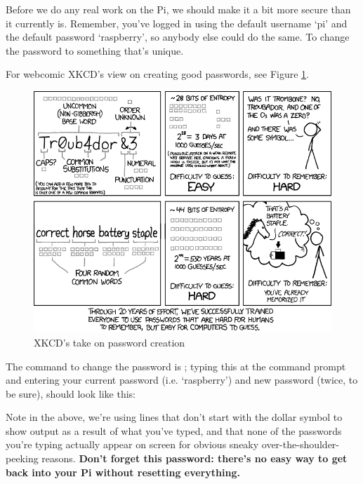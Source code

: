 Before we do any real work on the Pi, we should make it a bit more secure than it currently is. Remember, you've logged in using the default username `pi' and the default password `raspberry', so anybody else could do the same. To change the password to something that's unique. 

For webcomic XKCD's view on creating good passwords, see Figure \ref{figure:xkcd-password}.

\begin{figure}
\centerline{\includegraphics[width=13.5cm]{images/xkcd-password-strength}}
\caption{XKCD's take on password creation }\label{figure:xkcd-password}
\end{figure}

The command to change the password is ; typing this at the command prompt and entering your current password (i.e. `raspberry') and new password (twice, to be sure), should look like this:



\noindent Note in the above, we're using lines that don't start with the dollar symbol to show output as a result of what you've typed, and that none of the passwords you're typing actually appear on screen for obvious sneaky over-the-shoulder-peeking reasons. \textbf{Don't forget this password: there's no easy way to get back into your Pi without resetting everything.}

